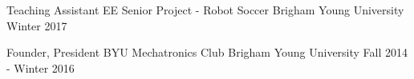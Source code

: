 

\begin{cvhonors}

  \cvhonor
    {Teaching Assistant} %
    {EE Senior Project - Robot Soccer} %
    {Brigham Young University} %
    {Winter 2017} %

  \cvhonor
    {Founder, President} %
    {BYU Mechatronics Club} %
    {Brigham Young University} %
    {Fall 2014 - Winter 2016} %

\end{cvhonors}
